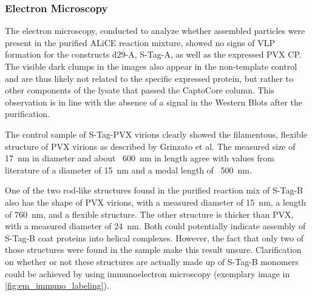 \subsubsection{Electron Microscopy}
The electron microscopy, conducted to analyze whether assembled particles were present in the purified ALiCE reaction mixture, showed no signs of VLP formation for the constructs d29-A, S-Tag-A, as well as the expressed PVX CP. The visible dark clumps in the images also appear in the non-template control and are thus likely not related to the specific expressed protein, but rather to other components of the lysate that passed the CaptoCore column. This observation is in line with the absence of a signal in the Western Blots after the purification. 

The control sample of S-Tag-PVX virions clearly showed the filamentous, flexible structure of PVX virions as described by Grinzato et al. The measured size of \SI{17}{\nano\meter} in diameter and about ~\SI{600}{\nano\meter} in length agree with values from literature of a diameter of \SI{15}{\nano\meter} and a modal length of ~\SI{500}{\nano\meter}. 

One of the two rod-like structures found in the purified reaction mix of S-Tag-B also has the shape of PVX virions, with a measured diameter of \SI{15}{\nano\meter}, a length of \SI{760}{\nano\meter}, and a flexible structure. The other structure is thicker than PVX, with a measured diameter of \SI{24}{\nano\meter}. Both could potentially indicate assembly of S-Tag-B coat proteins into helical complexes. However, the fact that only two of those structures were found in the sample make this result unsure. Clarification on whether or not these structures are actually made up of S-Tag-B monomers could be achieved by using immunoelectron microscopy (exemplary image in \autoref{fig:em_immuno_labeling}).

